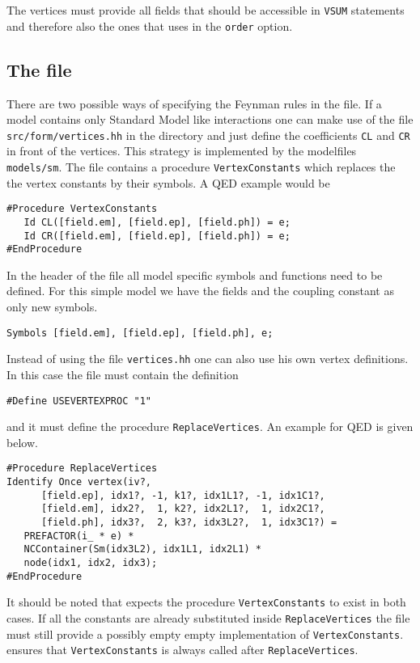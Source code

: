 The vertices must provide all fields that should be accessible in \texttt{VSUM} statements
and therefore also the ones that \gosamv{} uses in the \texttt{order} option.

\subsection{The \form{} file}
There are two possible ways of specifying the Feynman rules in the \form{} file.
If a model contains only Standard Model like interactions one can make use of
the file \texttt{src/form/vertices.hh} in the \gosamv{} directory and just define
the coefficients \texttt{CL} and \texttt{CR} in front of the vertices. This
strategy is implemented by the modelfiles \texttt{models/sm}. The file
\form{} contains a procedure \texttt{VertexConstants} which
replaces the the vertex constants by their symbols. A QED example would be
\begin{lstlisting}[style=form]
#Procedure VertexConstants
   Id CL([field.em], [field.ep], [field.ph]) = e;
   Id CR([field.em], [field.ep], [field.ph]) = e;
#EndProcedure
\end{lstlisting}
In the header of the \form{} file all model specific
symbols and functions need to be defined. For this simple
model we have the fields and the coupling constant as only
new symbols.
\begin{lstlisting}[style=form]
Symbols [field.em], [field.ep], [field.ph], e;
\end{lstlisting}

Instead of using the file \texttt{vertices.hh} one can also use
his own vertex definitions. In this case the \form{} file must contain
the definition
\begin{lstlisting}[style=form]
#Define USEVERTEXPROC "1"
\end{lstlisting}
and it must define the procedure \texttt{ReplaceVertices}. An example
for QED is given below.
\begin{lstlisting}[style=form]
#Procedure ReplaceVertices
Identify Once vertex(iv?,
      [field.ep], idx1?, -1, k1?, idx1L1?, -1, idx1C1?,
      [field.em], idx2?,  1, k2?, idx2L1?,  1, idx2C1?,
      [field.ph], idx3?,  2, k3?, idx3L2?,  1, idx3C1?) =
   PREFACTOR(i_ * e) *
   NCContainer(Sm(idx3L2), idx1L1, idx2L1) *
   node(idx1, idx2, idx3);
#EndProcedure
\end{lstlisting}
It should be noted that \gosamv{} expects the procedure \texttt{VertexConstants}
to exist in both cases. If all the constants are already substituted inside
\texttt{ReplaceVertices} the file must still provide a possibly empty empty
implementation of \texttt{VertexConstants}. \gosamv{} ensures that
\texttt{VertexConstants} is always called after \texttt{ReplaceVertices}.

